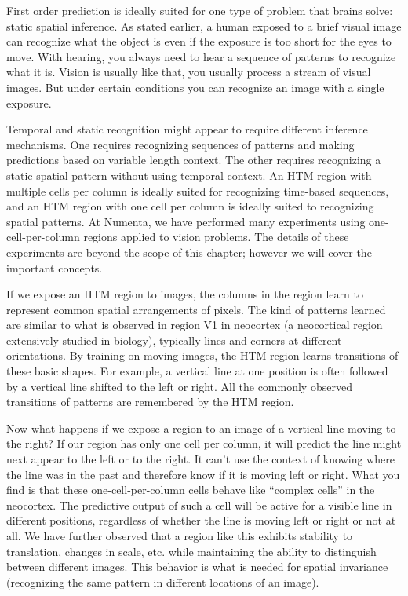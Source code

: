 First order prediction is ideally suited for one type of problem that
brains solve: static spatial inference. As stated earlier, a human
exposed to a brief visual image can recognize what the object is even
if the exposure is too short for the eyes to move. With hearing, you
always need to hear a sequence of patterns to recognize what it
is. Vision is usually like that, you usually process a stream of
visual images. But under certain conditions you can recognize an image
with a single exposure.

Temporal and static recognition might appear to require different
inference mechanisms. One requires recognizing sequences of patterns
and making predictions based on variable length context. The other
requires recognizing a static spatial pattern without using temporal
context. An HTM region with multiple cells per column is ideally
suited for recognizing time-based sequences, and an HTM region with
one cell per column is ideally suited to recognizing spatial
patterns. At Numenta, we have performed many experiments using
one-cell-per-column regions applied to vision problems. The details of
these experiments are beyond the scope of this chapter; however we
will cover the important concepts.

If we expose an HTM region to images, the columns in the region learn
to represent common spatial arrangements of pixels. The kind of
patterns learned are similar to what is observed in region V1 in
neocortex (a neocortical region extensively studied in biology),
typically lines and corners at different orientations. By training on
moving images, the HTM region learns transitions of these basic
shapes. For example, a vertical line at one position is often followed
by a vertical line shifted to the left or right. All the commonly
observed transitions of patterns are remembered by the HTM region.

Now what happens if we expose a region to an image of a vertical line
moving to the right? If our region has only one cell per column, it
will predict the line might next appear to the left or to the
right. It can't use the context of knowing where the line was in the
past and therefore know if it is moving left or right. What you find
is that these one-cell-per-column cells behave like ``complex cells''
in the neocortex. The predictive output of such a cell will be active
for a visible line in different positions, regardless of whether the
line is moving left or right or not at all. We have further observed
that a region like this exhibits stability to translation, changes in
scale, etc. while maintaining the ability to distinguish between
different images. This behavior is what is needed for spatial
invariance (recognizing the same pattern in different locations of an
image).

